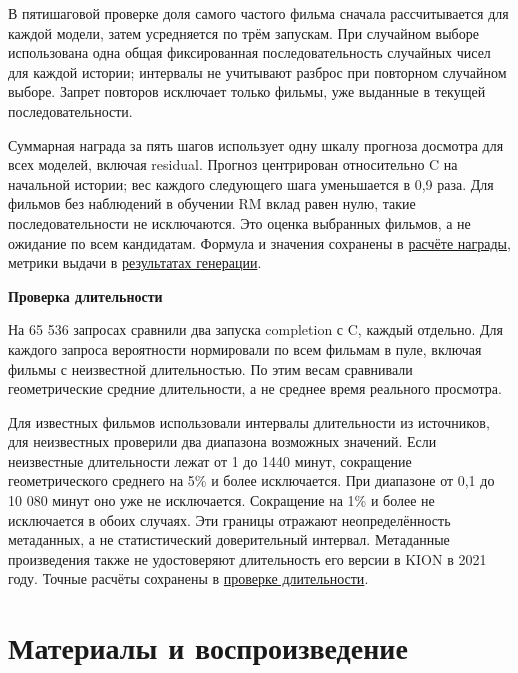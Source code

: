 \documentclass[11pt,a4paper]{article}
\begin{document}
В пятишаговой проверке доля самого частого фильма сначала рассчитывается для каждой модели, затем усредняется по трём запускам. При случайном выборе использована одна общая фиксированная последовательность случайных чисел для каждой истории; интервалы не учитывают разброс при повторном случайном выборе. Запрет повторов исключает только фильмы, уже выданные в текущей последовательности.

Суммарная награда за пять шагов использует одну шкалу прогноза досмотра для всех моделей, включая residual. Прогноз центрирован относительно C на начальной истории; вес каждого следующего шага уменьшается в 0,9 раза. Для фильмов без наблюдений в обучении RM вклад равен нулю, такие последовательности не исключаются. Это оценка выбранных фильмов, а не ожидание по всем кандидатам. Формула и значения сохранены в \href{https://github.com/suprend/kion-rl-recsys/blob/5c6858e46705fb4baa350d36914905b061376ed3/report-latex/rollout-reward256.json}{расчёте награды}, метрики выдачи в \href{https://github.com/suprend/kion-rl-recsys/blob/5c6858e46705fb4baa350d36914905b061376ed3/report-latex/rollout256.json}{результатах генерации}.

\textbf{Проверка длительности}

На 65 536 запросах сравнили два запуска completion с C, каждый отдельно. Для каждого запроса вероятности нормировали по всем фильмам в пуле, включая фильмы с неизвестной длительностью. По этим весам сравнивали геометрические средние длительности, а не среднее время реального просмотра.

Для известных фильмов использовали интервалы длительности из источников, для неизвестных проверили два диапазона возможных значений. Если неизвестные длительности лежат от 1 до 1440 минут, сокращение геометрического среднего на 5\% и более исключается. При диапазоне от 0,1 до 10 080 минут оно уже не исключается. Сокращение на 1\% и более не исключается в обоих случаях. Эти границы отражают неопределённость метаданных, а не статистический доверительный интервал. Метаданные произведения также не удостоверяют длительность его версии в KION в 2021 году. Точные расчёты сохранены в \href{https://github.com/suprend/kion-rl-recsys/blob/5c6858e46705fb4baa350d36914905b061376ed3/report-latex/duration-summary.json}{проверке длительности}.

\section{Материалы и воспроизведение}
\end{document}
